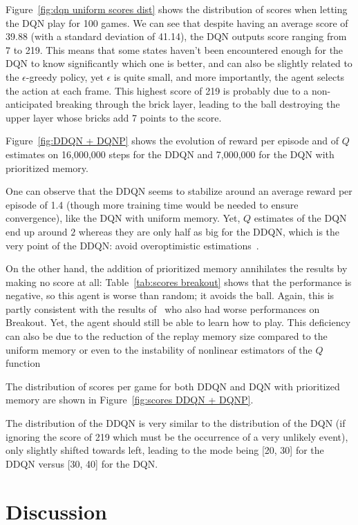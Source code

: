 \documentclass[letterpaper]{article}
\begin{document}
Figure~\ref{fig:dqn uniform scores dist} shows the distribution of scores when letting the DQN play for 100 games. We can see that despite having an
average score of 39.88 (with a standard deviation of 41.14), the DQN outputs score ranging from 7 to 219. This means that some states haven't been encountered
enough for the DQN to know significantly which one is better, and can also be slightly related to the $\epsilon$-greedy policy, yet $\epsilon$ is quite small,
and more importantly, the agent selects the action at each frame. This highest score of 219 is probably due to a non-anticipated breaking through
the brick layer, leading to the ball destroying the upper layer whose bricks add 7 points to the score.

Figure~\ref{fig:DDQN + DQNP} shows the evolution of reward per episode and of $Q$ estimates on 16,000,000 steps for the DDQN and 7,000,000 for the DQN with
prioritized memory.

One can observe that the DDQN seems to stabilize around an average reward per episode of 1.4 (though more training time would be needed to ensure convergence),
like the DQN with uniform memory. Yet, $Q$ estimates of the DQN end up around $2$ whereas they are only half as big for the DDQN, which is the very point of
the DDQN: avoid overoptimistic estimations~\citep{DBLP:journals/corr/WangFL15}.

On the other hand, the addition of prioritized memory annihilates the results by making no score at all: Table~\ref{tab:scores breakout} shows that the performance
is negative, so this agent is worse than random; it avoids the ball. Again, this is partly consistent with the results of~\cite{DBLP:journals/corr/SchaulQAS15}
who also had worse performances on Breakout. Yet, the agent should still be able to learn how to play. This deficiency can also be due to the reduction of
the replay memory size compared to the uniform memory or even to the instability of nonlinear estimators of the $Q$ function~\citep{tsitsiklis1996analysis}

The distribution of scores per game for both DDQN and DQN with prioritized memory are shown in Figure~\ref{fig:scores DDQN + DQNP}.

The distribution of the DDQN is very similar to the distribution of the DQN (if ignoring the score of 219 which must be the occurrence
of a very unlikely event), only slightly shifted towards left, leading to the mode being [20, 30] for the DDQN versus [30, 40] for the DQN.

\section{Discussion}
\end{document}
